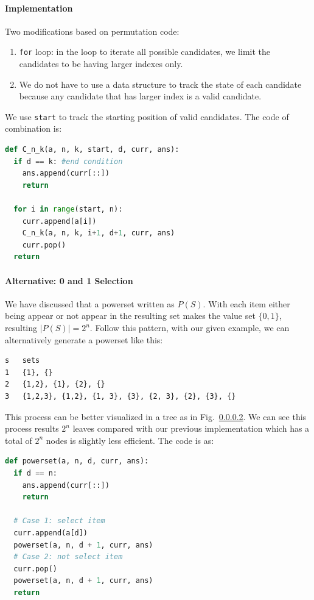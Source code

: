 \documentclass[../main.tex]{subfiles}
\begin{document}
\paragraph{Implementation} Two modifications based on permutation code:
\begin{enumerate}
    \item \texttt{for} loop: in the loop to iterate all possible candidates, we limit the candidates to be having larger indexes only.
    \item We do not have to use a data structure to track the state of each candidate because any candidate that has larger index is a valid candidate.
\end{enumerate}
We use \texttt{start} to track the starting position of valid candidates. The code of combination is:
\begin{lstlisting}[language=Python]
def C_n_k(a, n, k, start, d, curr, ans):
  if d == k: #end condition
    ans.append(curr[::]) 
    return
  
  for i in range(start, n):    
    curr.append(a[i])
    C_n_k(a, n, k, i+1, d+1, curr, ans)
    curr.pop()
  return
\end{lstlisting}

\paragraph{Alternative: 0 and 1 Selection} We have discussed that a powerset written as $P(S)$. With each item either being appear or not appear in the resulting set makes the value set $\{0, 1\}$, resulting $|P(S)| = 2^n$. Follow this pattern, with our given example, we can alternatively generate a powerset like this:
\begin{lstlisting}[numbers=none]
s   sets
1   {1}, {}
2   {1,2}, {1}, {2}, {}
3   {1,2,3}, {1,2}, {1, 3}, {3}, {2, 3}, {2}, {3}, {}
\end{lstlisting}
This process can be better visualized in a tree as in Fig.~\ref{}. We can see this process results $2^n$ leaves compared with our previous implementation which has a total of $2^n$ nodes is slightly less efficient. The code is as:
\begin{lstlisting}[language=Python]
def powerset(a, n, d, curr, ans):
  if d == n:
    ans.append(curr[::]) 
    return

  # Case 1: select item
  curr.append(a[d])
  powerset(a, n, d + 1, curr, ans)
  # Case 2: not select item
  curr.pop()
  powerset(a, n, d + 1, curr, ans)
  return
\end{lstlisting}
\end{document}
